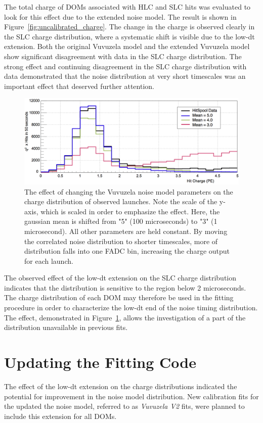 The total charge of DOMs associated with HLC and SLC hits was evaluated to look for this effect due to the extended noise model.
The result is shown in Figure~\ref{fig:uncalibrated_charge}.
The change in the charge is observed clearly in the SLC charge distribution, where a systematic shift is visible due to the low-dt extension.
Both the original Vuvuzela model and the extended Vuvuzela model show significant disagreement with data in the SLC charge distribution.
The strong effect and continuing disagreement in the SLC charge distribution with data demonstrated that the noise distribution at very short timescales was an important effect that deserved further attention.

\begin{figure}[h]
\centering
\includegraphics[width=0.5\pagewidth]{lowdt_charge_effects.png} 
\caption[The effect of low-dt Vuvuzela in the charge distribution]{The effect of changing the Vuvuzela noise model parameters on the charge distribution of observed launches. Note the scale of the y-axis, which is scaled in order to emphasize the effect. Here, the gaussian mean is shifted from "5" (100 microseconds) to "3" (1 microsecond). All other parameters are held constant. By moving the correlated noise distribution to shorter timescales, more of distribution falls into one FADC bin, increasing the charge output for each launch. }
\label{fig:lowdt_effect_charge}
\end{figure}

The observed effect of the low-dt extension on the SLC charge distribution indicates that the distribution is sensitive to the region below 2 microseconds.
The charge distribution of each DOM may therefore be used in the fitting procedure in order to characterize the low-dt end of the noise timing distribution.
The effect, demonstrated in Figure~\ref{fig:lowdt_effect_charge}, allows the investigation of a part of the distribution unavailable in previous fits.

\section{Updating the Fitting Code}
\label{sec:vuvuzela_fitting}
The effect of the low-dt extension on the charge distributions indicated the potential for improvement in the noise model distribution.
New calibration fits for the updated the noise model, referred to as \emph{Vuvuzela V2} fits, were planned to include this extension for all DOMs.

